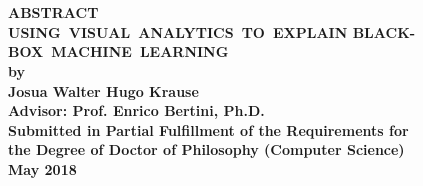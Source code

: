 \documentclass[12pt,letterpaper]{report}
\newcommand{\thesistitle}{USING~VISUAL~ANALYTICS~TO~EXPLAIN
BLACK-BOX~MACHINE~LEARNING}
\newcommand{\thesisauthor}{Josua Walter Hugo Krause}
\newcommand{\thesisadvisor}{Enrico Bertini, Ph.D.}
\newcommand{\graddate}{May 2018} %
\begin{document}
\section*{}
\begin{center}
{\bfseries 
  \vspace{.25in}  
  {\bf ABSTRACT}\\
  \vspace{.25in}
  {\bf \thesistitle}\\  
  \vspace{.25in}
  {\bf by}\\  
  \vspace{.5in}
  {\bf \thesisauthor}\\
  \vspace{.5in}
  {\bf Advisor: Prof. \thesisadvisor}\\
  \vspace{.25in}
  {\bf Submitted in Partial Fulfillment of the Requirements for}\\
  {\bf the Degree of Doctor of Philosophy (Computer Science)}\\
  \vspace{.25in}
  {\bf \graddate}  
  \vspace{.25in}
}
\end{center}

\newpage

\tableofcontents

\listoffigures{}
\newpage

\listoftables{}
\newpage


%
\end{document}
